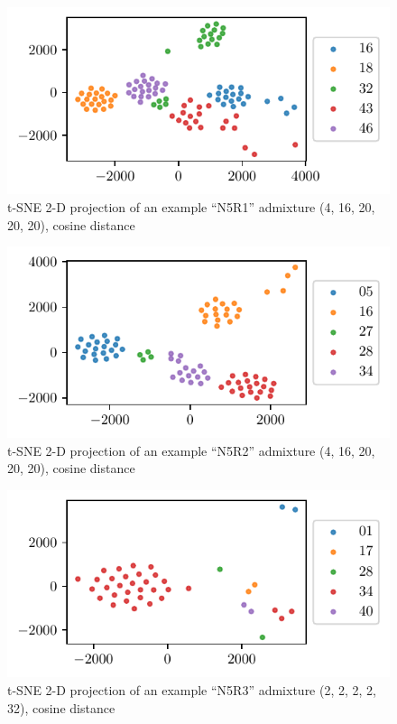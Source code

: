 \begin{figure}
\centering
\includegraphics{./figures/data_visualization/N5R1[0]-t-SNE (metric=cosine), X_heights.pdf}
\caption{t-SNE 2-D projection of an example ``N5R1'' admixture (4, 16, 20, 20, 20), cosine distance}
\label{fig:N5R1[0]-t-SNE (metric=cosine), X_heights}
\end{figure}
\begin{figure}
\centering
\includegraphics{./figures/data_visualization/N5R2[0]-t-SNE (metric=cosine), X_heights.pdf}
\caption{t-SNE 2-D projection of an example ``N5R2'' admixture (4, 16, 20, 20, 20), cosine distance}
\label{fig:N5R2[0]-t-SNE (metric=cosine), X_heights}
\end{figure}
\begin{figure}
\centering
\includegraphics{./figures/data_visualization/N5R3[0]-t-SNE (metric=cosine), X_heights.pdf}
\caption{t-SNE 2-D projection of an example ``N5R3'' admixture (2, 2, 2, 2, 32), cosine distance}
\label{fig:N5R3[0]-t-SNE (metric=cosine), X_heights}
\end{figure}


